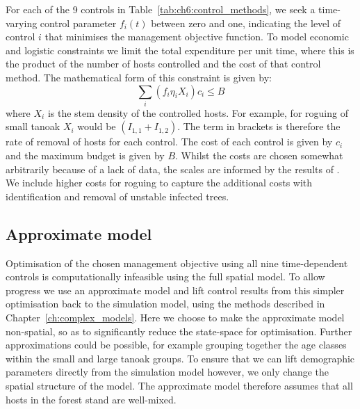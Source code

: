For each of the 9 controls in Table~\ref{tab:ch6:control_methods}, we seek a time-varying control parameter $f_i(t)$ between zero and one, indicating the level of control $i$ that minimises the management objective function. To model economic and logistic constraints we limit the total expenditure per unit time, where this is the product of the number of hosts controlled and the cost of that control method. The mathematical form of this constraint is given by:
\begin{equation}
    \sum_i \left(f_i\eta_iX_i\right)c_i \leq B
\end{equation}
where $X_i$ is the stem density of the controlled hosts. For example, for roguing of small tanoak $X_i$ would be $\left(I_{1,1} + I_{1,2}\right)$. The term in brackets is therefore the rate of removal of hosts for each control. The cost of each control is given by $c_i$ and the maximum budget is given by $B$. Whilst the costs are chosen somewhat arbitrarily because of a lack of data, the scales are informed by the results of \citet{kovacs_predicting_2011}. We include higher costs for roguing to capture the additional costs with identification and removal of unstable infected trees.

\subsection{Approximate model}

Optimisation of the chosen management objective using all nine time-dependent controls is computationally infeasible using the full spatial model. To allow progress we use an approximate model and lift control results from this simpler optimisation back to the simulation model, using the methods described in Chapter~\ref{ch:complex_models}. Here we choose to make the approximate model non-spatial, so as to significantly reduce the state-space for optimisation. Further approximations could be possible, for example grouping together the age classes within the small and large tanoak groups. To ensure that we can lift demographic parameters directly from the simulation model however, we only change the spatial structure of the model. The approximate model therefore assumes that all hosts in the forest stand are well-mixed.

